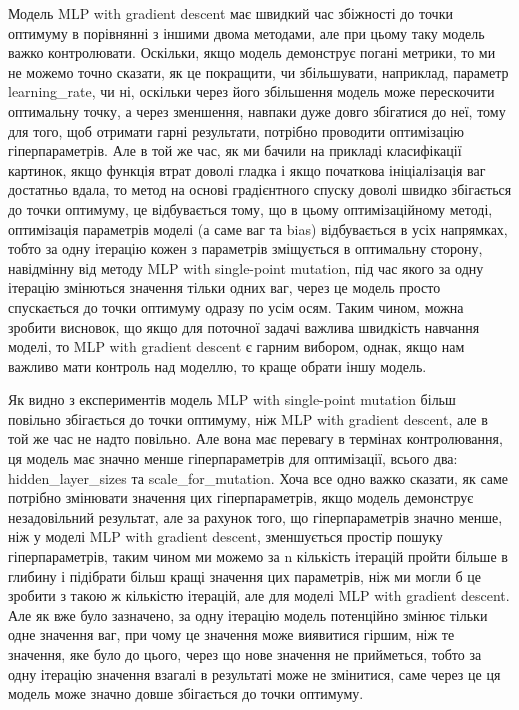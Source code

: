 Модель MLP with gradient descent має швидкий час збіжності до точки оптимуму в порівнянні з іншими двома методами, але при цьому таку модель важко контролювати. Оскільки, якщо модель демонструє погані метрики, то ми не можемо точно сказати, як це покращити, чи збільшувати, наприклад, параметр learning\_rate, чи ні, оскільки через його збільшення модель може перескочити оптимальну точку, а через зменшення, навпаки дуже довго збігатися до неї, тому для того, щоб отримати гарні результати, потрібно проводити оптимізацію гіперпараметрів. Але в той же час, як ми бачили на прикладі класифікації картинок, якщо функція втрат доволі гладка і якщо початкова ініціалізація ваг достатньо вдала, то метод на основі градієнтного спуску доволі швидко збігається до точки оптимуму, це відбувається тому, що в цьому оптимізаційному методі, оптимізація параметрів моделі (а саме ваг та bias) відбувається в усіх напрямках, тобто за одну ітерацію кожен з параметрів зміщується в оптимальну сторону, навідмінну від методу MLP with single-point mutation, під час якого за одну ітерацію змінються значення тільки одних ваг, через це модель просто спускається до точки оптимуму одразу по усім осям. Таким чином, можна зробити висновок, що якщо для поточної задачі важлива швидкість навчання моделі, то MLP with gradient descent є гарним вибором, однак, якщо нам важливо мати контроль над моделлю, то краще обрати іншу модель.

Як видно з експериментів модель MLP with single-point mutation більш повільно збігається до точки оптимуму, ніж MLP with gradient descent, але в той же час не надто повільно. Але вона має перевагу в термінах контролювання, ця модель має значно менше гіперпараметрів для оптимізації, всього два: hidden\_layer\_sizes та scale\_for\_mutation. Хоча все одно важко сказати, як саме потрібно змінювати значення цих гіперпараметрів, якщо модель демонструє незадовільний результат, але за рахунок того, що гіперпараметрів значно менше, ніж у моделі MLP with gradient descent, зменшується простір пошуку гіперпараметрів, таким чином ми можемо за n кількість ітерацій пройти більше в глибину і підібрати більш кращі значення цих параметрів, ніж ми могли б це зробити з такою ж кількістю ітерацій, але для моделі MLP with gradient descent. Але як вже було зазначено, за одну ітерацію модель потенційно змінює тільки одне значення ваг, при чому це значення може виявитися гіршим, ніж те значення, яке було до цього, через що нове значення не прийметься, тобто за одну ітерацію значення взагалі в результаті може не змінитися, саме через це ця модель може значно довше збігається до точки оптимуму.


